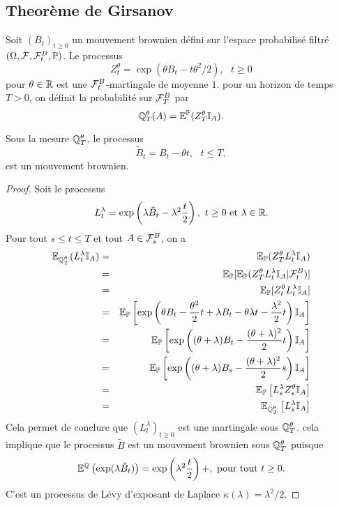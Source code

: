 \subsection{Theorème de Girsanov}
Soit $(B_t)_{t\geq 0}$ un mouvement brownien défini sur l'espace probabilisé filtré $(\Omega, \mathcal{F}, \mathcal{F}_t^B, \mathbb{P})$. 
Le processus 
$$
Z_t^\theta = \exp\left(\theta B_t - t\theta^2/2 \right),\text{ }t\geq 0
$$
pour $\theta\in \mathbb{R}$ est une $\mathcal{F}_t^B$-martingale de moyenne $1$. pour un horizon de temps $T>0$, on définit la probabilité sur $\mathcal{F}_T^B$ par
$$
\mathbb{Q}_T^\theta(A) = \mathbb{E}^{\mathbb{P}}(Z_T^\theta\mathbb{I}_A).
$$
\begin{theo}
Sous la mesure $\mathbb{Q}_T^\theta$, le processus 
$$
\tilde{B}_t = B_t - \theta t,\text{ }t\leq T,
$$
est un mouvement brownien.
\end{theo}
\begin{proof}
Soit le processus 
$$
L_t^\lambda = \exp\left(\lambda \tilde{B}_t - \lambda^2\frac{t}{2}\right),\text{ }t\geq 0\text{ et }\lambda\in\mathbb{R}.
$$
Pour tout $s\leq t\leq T$ et tout $A\in\mathcal{F}_s^B$, on a 
\begin{eqnarray*}
\mathbb{E}_{\mathbb{Q}^\theta_T}(L_t^\lambda\mathbb{I}_A) &=&\mathbb{E}_{\mathbb{P}}(Z_T^\theta L_t^\lambda\mathbb{I}_A)\\ 
&=&\mathbb{E}_{\mathbb{P}}[\mathbb{E}_{\mathbb{P}}(Z_T^\theta L_t^\lambda\mathbb{I}_A|\mathcal{F}_t^B)]\\ 
&=&\mathbb{E}_{\mathbb{P}}[Z_t^\theta L_t^\lambda\mathbb{I}_A]\\ 
&=& \mathbb{E}_{\mathbb{P}}\left[\exp\left(\theta B_t - \frac{\theta^2}{2}t + \lambda B_t - \theta\lambda t -\frac{\lambda^2}{2}t\right)\mathbb{I}_A\right]\\ 
&=& \mathbb{E}_{\mathbb{P}}\left[\exp\left((\theta+\lambda) B_t - \frac{(\theta+\lambda)^2}{2}t \right)\mathbb{I}_A\right]\\ 
&=& \mathbb{E}_{\mathbb{P}}\left[\exp\left((\theta+\lambda) B_s - \frac{(\theta+\lambda)^2}{2}s \right)\mathbb{I}_A\right]\\
&=& \mathbb{E}_{\mathbb{P}}\left[L^\lambda_sZ_s^\theta\mathbb{I}_A\right]\\
&=&\mathbb{E}_{\mathbb{Q}^\theta_T}\left[L^\lambda_s\mathbb{I}_A\right] 
\end{eqnarray*}
Cela permet de conclure que $(L_t^\lambda)_{t\geq 0}$ est une martingale sous $\mathbb{Q}^\theta_T$. cela implique que le processus $\tilde{B}$ est un mouvement brownien sous $\mathbb{Q}^\theta_T$ puisque 
$$
\mathbb{E}^{\mathbb{Q}}\left(\exp(\lambda \tilde{B}_t)\right) = \exp\left(\lambda^2\frac{t}{2}\right)
+,\text{ pour tout }t\geq 0.
$$
C'est un processus de Lévy d'exposant de Laplace $\kappa(\lambda) = \lambda^2/2$.
\end{proof}
